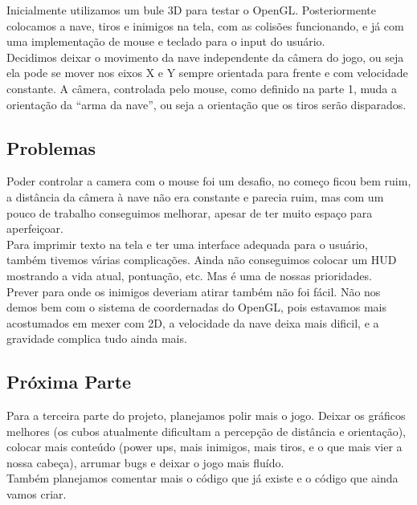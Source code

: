 \documentclass[12pt,a4paper]{article}
\begin{document}
    		Inicialmente utilizamos um bule 3D para testar o OpenGL. Posteriormente colocamos a nave, tiros e inimigos
		na tela, com as colisões funcionando, e já com uma implementação de mouse e teclado para o input do usuário.\\
    		
    		Decidimos deixar o movimento da nave independente da câmera do jogo, ou seja ela pode se mover
		nos eixos X e Y sempre orientada para frente e com velocidade constante. A câmera, controlada pelo mouse,
		como definido na parte 1, muda a orientação da ``arma da nave'', ou seja a orientação que os tiros serão 				disparados.\\
		
		\subsection{Problemas}
		Poder controlar a camera com o mouse foi um desafio, no começo ficou bem ruim, a distância da câmera à nave
		não era constante e parecia ruim, mas com um pouco de trabalho conseguimos melhorar, apesar de ter muito 				espaço para aperfeiçoar. \\
    		
    		Para imprimir texto na tela e ter uma interface adequada para o usuário, também tivemos várias complicações.
    		Ainda não conseguimos colocar um HUD mostrando a vida atual, pontuação, etc. Mas é uma de nossas prioridades.\\
    		
    		Prever para onde os inimigos deveriam atirar também não foi fácil. Não nos demos bem com o sistema de 				coordernadas do OpenGL, pois estavamos mais acostumados em mexer com 2D, a velocidade da nave deixa mais 				dificil, e a gravidade complica tudo ainda mais.
		
		
		\subsection{Próxima Parte}
		Para a terceira parte do projeto, planejamos polir mais o jogo. Deixar os gráficos melhores (os cubos
		atualmente dificultam a percepção de distância e orientação), colocar mais conteúdo (power ups, mais 					inimigos, mais tiros, e o que mais vier a nossa cabeça), arrumar bugs e deixar o jogo mais fluído.\\
		
		Também planejamos comentar mais o código que já existe e o código que ainda vamos criar.
		
\end{document}
